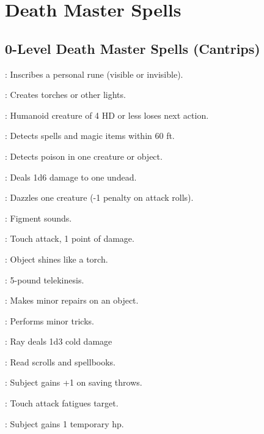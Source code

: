 \section{Death Master Spells}

\begin{multicols}{2}

\subsection{0-Level Death Master Spells (Cantrips)}
\begin{description*}
\item[\linkspell{Arcane Mark}:] Inscribes a personal rune (visible or invisible).
\item[\linkspell{Dancing Lights}:] Creates torches or other lights.
\item[\linkspell{Daze}:] Humanoid creature of 4 HD or less loses next action.
\item[\linkspell{Detect Magic}:] Detects spells and magic items within 60 ft.
\item[\linkspell{Detect Poison}:] Detects poison in one creature or object.
\item[\linkspell{Disrupt Undead}:] Deals 1d6 damage to one undead.
\item[\linkspell{Flare}:] Dazzles one creature (-1 penalty on attack rolls).
\item[\linkspell{Ghost Sound}:] Figment sounds.
\item[\linkspell{Inflict Minor Wounds}:] Touch attack, 1 point of damage.
\item[\linkspell{Light}:] Object shines like a torch.
\item[\linkspell{Mage Hand}:] 5-pound telekinesis.
\item[\linkspell{Mending}:] Makes minor repairs on an object.
\item[\linkspell{Prestidigitation}:] Performs minor tricks.
\item[\linkspell{Ray of Frost}:] Ray deals 1d3 cold damage
\item[\linkspell{Read Magic}:] Read scrolls and spellbooks.
\item[\linkspell{Resistance}:] Subject gains +1 on saving throws.
\item[\linkspell{Touch of Fatigue}:] Touch attack fatigues target.
\item[\linkspell{Virtue}:] Subject gains 1 temporary hp.
\end{description*}


\end{multicols}
